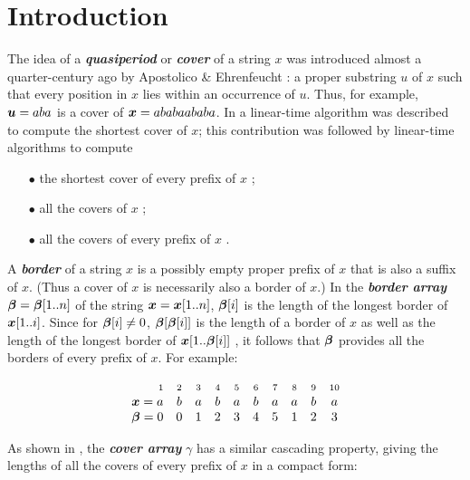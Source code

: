 \documentclass[runningheads,a4paper]{llncs}
\def\s#1{\mbox{\boldmath $#1$}}
\def\itbf#1{\textit{\textbf{#1}}}
\begin{document}
\section{Introduction}\label{sect-intro}
The idea of a \itbf{quasiperiod} or \itbf{cover} of a string \s{x}
was introduced almost a quarter-century ago by
Apostolico \& Ehrenfeucht \cite{AE90}:
a proper substring \s{u} of \s{x} such that every position in \s{x}
lies within an occurrence of \s{u}.
Thus, for example, $\s{u} = aba$ is a cover of
$\s{x} = ababaababa$.
In \cite{AFI91} a linear-time algorithm was described
to compute the shortest cover of \s{x};
this contribution was followed by linear-time algorithms to compute

\begin{itemize}
\item[$\bullet$]
the shortest cover of every prefix of \s{x} \cite{B92};
\item[$\bullet$]
all the covers of \s{x} \cite{MS94,MS95};
\item[$\bullet$]
all the covers of every prefix of \s{x} \cite{LS02}.
\end{itemize}

A \itbf{border} of a string \s{x} is a possibly empty
proper prefix of \s{x} that is also a suffix of \s{x}.
(Thus a cover of \s{x} is necessarily also a border of \s{x}.)
In the \itbf{border array} $\s{\beta} = \s{\beta}[1..n]$
of the string $\s{x} = \s{x}[1..n]$,
$\s{\beta}[i]$ is the length of the longest border of $\s{x}[1..i]$.
Since for $\s{\beta}[i] \ne 0$, $\s{\beta}[\s{\beta}[i]]$
is the length of a border of \s{x} as well as
the length of the longest border of $\s{x}[1..\s{\beta}[i]]$
\cite{AHU74,S03},
it follows that $\s{\beta}$ provides all the borders
of every prefix of \s{x}.
For example:

\begin{equation}
\begin{array}{rcccccccccc}
\scriptstyle 1 & \scriptstyle 2 & \scriptstyle 3 & \scriptstyle 4 & \scriptstyle 5 & \scriptstyle 6 & \scriptstyle 7 & \scriptstyle 8 & \scriptstyle 9 & \scriptstyle 10 \\
\s{x} = a & b & a & b & a & b & a & a & b & a \label{x} \\
\s{\beta} = 0 & 0 & 1 & 2 & 3 & 4 & 5 & 1 & 2 & 3
\end{array}
\end{equation}

As shown in \cite{LS02}, the \itbf{cover array} \s{\gamma}
has a similar cascading property, giving the lengths
of all the covers of every prefix of \s{x} in a compact form:
\end{document}
